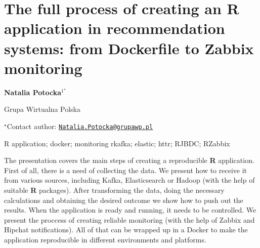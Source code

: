 \documentclass[\main/boa.tex]{subfiles}
\begin{document}
\pagestyle{empty}

\section{The full process of creating an R application in recommendation systems:
from Dockerfile to Zabbix monitoring}

\begin{center}
  {\bf Natalia Potocka$^{1^\star}$}
\end{center}

\vskip 0.3cm

\begin{affiliations}
\begin{enumerate}
\begin{minipage}{0.915\textwidth}
\centering
\item Grupa Wirtualna Polska \\[-2pt]
\end{minipage}
\end{enumerate}
$^\star$Contact author: \href{mailto:Natalia.Potocka@grupawp.pl}{\nolinkurl{Natalia.Potocka@grupawp.pl}}\\
\end{affiliations}

\vskip 0.5cm

\begin{minipage}{0.915\textwidth}
\keywords R application; docker; monitoring
\packages rkafka; elastic; httr; RJBDC; RZabbix
\end{minipage}

\vskip 0.8cm

The presentation covers the main steps of creating a reproducible
\textbf{R} application. First of all, there is a need of collecting the
data. We present how to receive it from various sources, including
Kafka, Elasticsearch or Hadoop (with the help of suitable \textbf{R}
packages). After transforming the data, doing the necessary calculations
and obtaining the desired outcome we show how to push out the results.
When the application is ready and running, it needs to be controlled. We
present the proccess of creating reliable monitoring (with the help of
Zabbix and Hipchat notifications). All of that can be wrapped up in a
Docker to make the application reproducible in different environments
and platforms.
\end{document}
